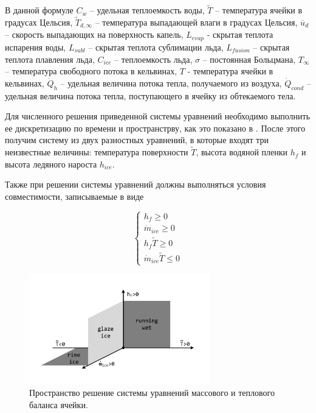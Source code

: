 \documentclass[
11pt,%
tightenlines,%
twoside,%
onecolumn,%
nofloats,%
nobibnotes,%
nofootinbib,%
superscriptaddress,%
noshowpacs,%
centertags]%
{revtex4}
\begin{document}
В данной формуле $C_w$ -- удельная теплоемкость воды, $\tilde{T}$ -- температура ячейки в градусах Цельсия, $\tilde{T}_{d,\infty}$ -- температура выпадающей влаги в градусах Цельсия, $\overline{u}_d$ -- скорость выпадающих на поверхность капель, $L_{evap}$ - скрытая теплота испарения воды, $L_{subl}$ -- скрытая теплота сублимации льда, $L_{fusion}$ -- скрытая теплота плавления льда, $C_{ice}$ -- теплоемкость льда, $\sigma$ -- постоянная Больцмана, $T_{\infty}$ -- температура свободного потока в кельвинах, $T$ - температура ячейки в кельвинах, $\dot Q_h$ -- удельная величина потока тепла, получаемого из воздуха, $\dot Q_{cond}$ -- удельная величина потока тепла, поступающего в ячейку из обтекаемого тела.

Для численного решения приведенной системы уравнений необходимо выполнить ее дискретизацию по времени и пространстрву, как это показано в \cite{Beaugendre}.
После этого получим систему из двух разностных уравнений, в которые входят три неизвестные величины: температура поверхности $\tilde{T}$, высота водяной пленки $h_f$ и высота ледяного нароста $h_{ice}$.  

Также при решении системы уравнений должны выполняться условия совместимости, записываемые в виде

\begin{equation}
\begin{cases}
h_f \ge 0\\
\dot m_{ice} \ge 0\\
h_f \tilde{T} \ge 0\\
\dot m_{ice} \tilde{T} \le 0
\end{cases}
\end{equation}

\begin{figure}[h]
\setcaptionmargin{5mm}
\onelinecaptionstrue
\includegraphics[width=0.7\textwidth]{pics/surface.pdf}
\caption{Пространство решение системы уравнений массового и теплового баланса ячейки.}\label{fig:surface}
\end{figure}
\end{document}
